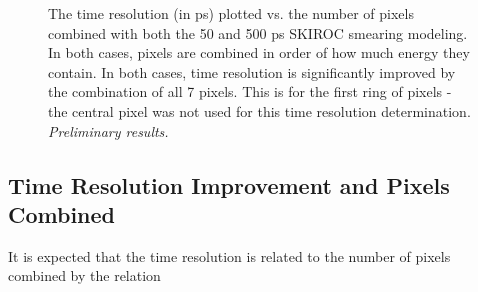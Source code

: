 \documentclass[twocolumn,aps,prd,reprint]{revtex4-1}
\begin{document}
\begin{figure}[!htbp]
\centering
{} 
\caption{The time resolution (in ps) plotted vs. the number of pixels combined with both the 50 and 500 ps SKIROC smearing modeling. In both cases, pixels are combined in order of how much energy they contain. In both cases, time resolution is significantly improved by the combination of all 7 pixels. This is for the first ring of pixels - the central pixel was not used for this time resolution determination. \textit{Preliminary results.}}
\label{500 and 50 smearing no center}
\end{figure}

\subsection{Time Resolution Improvement and Pixels Combined}

It is expected that the time resolution is related to the number of pixels combined by the relation
\end{document}
